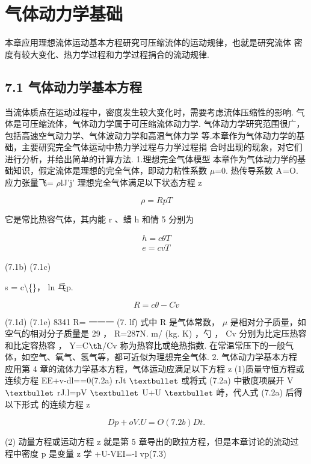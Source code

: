 \chapter{气体动力学基础}
本章应用理想流体运动基本方程研究可压缩流体的运动规律，也就是研究流体 密度有较大变化、热力学过程和力学过程捐合的流动规律.

\section*{7.1  气体动力学基本方程}

当流体质点在运动过程中，密度发生较大变化时，需要考虑流体压缩性的影响. 气体是可压缩流体，气体动力学属于可压缩流体动力学. 气体动力学研究范围很广，包括高速空气动力学、气体波动力学和高温气体力学 等.本章作为气体动力学的基础，主要研究完全气体运动中热力学过程与力学过程捐 合时出现的现象，对它们进行分析，并给出简单的计算方法. 1.理想完全气体模型 本章作为气体动力学的基础知识，假定流体是理想的完全气体，即动力粘性系数 $\mu$=0. 热传导系数 ${\rm A}$=O. 应力张量飞= $\rho$lJ'j' 理想完全气体满足以下状态方程 z

\begin{equation*}\rho  = RpT\tag{7.1a}\end{equation*}

它是常比热容气体，其内能 r 、蜡 h 和情 5 分别为

\begin{gather*}
h = c\theta T\\
e = cvT
\end{gather*}

(7.1b) (7.1c)

s = c\textbackslash\{\}， ln 乓p.

\[R = c\theta  - Cv\]

(7.1d) (7.1e) 8341 R= 一一一 (7. lf) 式中 R 是气体常数， $\mu$ 是相对分子质量，如空气的相对分子质量是 29 ， R=287N. m/ (kg. K) ，勺 ， Cv 分别为比定压热容和比定容热容 ， Y=C${\rm þ}$/Cv 称为热容比或绝热指数. 在常温常压下的一般气体，如空气、氧气、氢气等，都可近似为理想完全气体. 2. 气体动力学基本方程 应用第 4 章的流体力学基本方程，气体运动应满足以下方程 z (1)质量守恒方程或连续方程 EE+v-dl==0(7.2a) rJt ${\rm •}$ 或将式 (7.2a) 中散度项展开 V ${\rm •}$ rJ.l=pV ${\rm •}$ U+U ${\rm •}$ 峙，代人式 (7.2a) 后得以下形式 的连续方程 z

\[Dp+oV.U=O (7.2b) Dt .\]

(2) 动量方程或运动方程 z 就是第 5 章导出的欧拉方程，但是本章讨论的流动过 程中密度 p 是变量 z 学 +U-VEI=-l vp(7.3)

